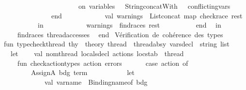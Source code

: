 \begin{isabellebody}
\ \ \ \ \ \ \ \ \ \ \ \ \ \ \ \ \ \ \ \ \ {\isachardoublequote}{\kern0pt}\ on\ variables{\isacharcolon}{\kern0pt}\ {\isachardoublequote}{\kern0pt}\ {\isacharcircum}{\kern0pt}\ String{\isachardot}{\kern0pt}concatWith\ {\isachardoublequote}{\kern0pt}{\isacharcomma}{\kern0pt}\ {\isachardoublequote}{\kern0pt}\ conflicting{\isacharunderscore}{\kern0pt}vars{\isacharbrackright}{\kern0pt}\isanewline
\ \ \ \ \ \ \ \ \ \ \ \ \ \ end\isanewline
\ \ \ \ \ \ \ \ \ \ \ \ val\ warnings\ {\isacharequal}{\kern0pt}\ List{\isachardot}{\kern0pt}concat\ {\isacharparenleft}{\kern0pt}map\ check{\isacharunderscore}{\kern0pt}race\ rest{\isacharparenright}{\kern0pt}\isanewline
\ \ \ \ \ \ \ \ \ \ in\isanewline
\ \ \ \ \ \ \ \ \ \ \ \ warnings\ {\isacharat}{\kern0pt}\ find{\isacharunderscore}{\kern0pt}races\ rest\isanewline
\ \ \ \ \ \ \ \ \ \ end\isanewline
\ \ in\isanewline
\ \ \ \ find{\isacharunderscore}{\kern0pt}races\ thread{\isacharunderscore}{\kern0pt}accesses\isanewline
\ \ end\isanewline
{\isacharparenleft}{\kern0pt}{\isacharasterisk}{\kern0pt}\ Vérification\ de\ cohérence\ des\ types\ {\isacharasterisk}{\kern0pt}{\isacharparenright}{\kern0pt}\isanewline
fun\ type{\isacharunderscore}{\kern0pt}check{\isacharunderscore}{\kern0pt}thread\ {\isacharparenleft}{\kern0pt}thy\ {\isacharcolon}{\kern0pt}\ theory{\isacharparenright}{\kern0pt}\ {\isacharparenleft}{\kern0pt}thread\ {\isacharcolon}{\kern0pt}\ thread{\isacharunderscore}{\kern0pt}absy{\isacharparenright}{\kern0pt}\ {\isacharparenleft}{\kern0pt}vars{\isacharunderscore}{\kern0pt}decl{\isacharparenright}{\kern0pt}\ {\isacharcolon}{\kern0pt}\ string\ list\ {\isacharequal}{\kern0pt}\isanewline
\ \ let\isanewline
\ \ \ \ val\ {\isacharbraceleft}{\kern0pt}nom{\isacharunderscore}{\kern0pt}thread{\isacharcomma}{\kern0pt}\ locals{\isacharunderscore}{\kern0pt}decl{\isacharcomma}{\kern0pt}\ actions{\isacharcomma}{\kern0pt}\ locstab{\isacharbraceright}{\kern0pt}\ {\isacharequal}{\kern0pt}\ thread\isanewline
\ \ \ \ fun\ check{\isacharunderscore}{\kern0pt}action{\isacharunderscore}{\kern0pt}types\ {\isacharparenleft}{\kern0pt}action{\isacharcomma}{\kern0pt}\ errors{\isacharparenright}{\kern0pt}\ {\isacharequal}{\kern0pt}\ \ \ \ \ \ case\ action\ of\isanewline
\ \ \ \ \ \ \ \ AssignA\ {\isacharparenleft}{\kern0pt}bdg{\isacharcomma}{\kern0pt}\ term{\isacharparenright}{\kern0pt}\ {\isacharequal}{\kern0pt}{\isachargreater}{\kern0pt}\isanewline
\ \ \ \ \ \ \ \ \ \ let\isanewline
\ \ \ \ \ \ \ \ \ \ \ \ val\ var{\isacharunderscore}{\kern0pt}name\ {\isacharequal}{\kern0pt}\ Binding{\isachardot}{\kern0pt}name{\isacharunderscore}{\kern0pt}of\ bdg\isanewline

\end{isabellebody}
